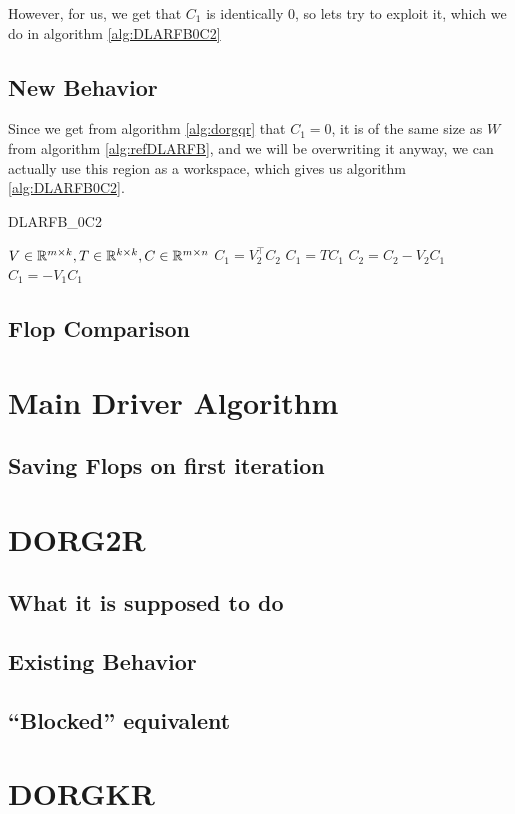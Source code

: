 \documentclass[12pt]{article}
\begin{document}
        However, for us, we get that $C_1$ is identically $0$, so lets try to exploit it, which we do in 
        algorithm \ref{alg:DLARFB0C2}
    \subsection{New Behavior}
    Since we get from algorithm \ref{alg:dorgqr} that $C_1 = 0$, it is of the same size as $W$ from 
    algorithm \ref{alg:refDLARFB}, and we will be overwriting it anyway, we can actually use this 
    region as a workspace, which gives us algorithm \ref{alg:DLARFB0C2}.
    \begin{algorithm}
        \caption{DLARFB\_0C2}\label{alg:DLARFB0C2}
        \begin{algorithmic}[1]
            \REQUIRE $V\in\mathbb{R}^{m\times k}, T\in\mathbb{R}^{k\times k}, C\in\mathbb{R}^{m\times n}$
            \STATE $C_1 = V_2^\top C_2$
            \STATE $C_1 = TC_1$
            \STATE $C_2 = C_2 - V_2C_1$
            \STATE $C_1 =     - V_1C_1$
        \end{algorithmic}
    \end{algorithm}
    \subsection{Flop Comparison}
    \section{Main Driver Algorithm}
    \subsection{Saving Flops on first iteration}
    \section{DORG2R}
    \subsection{What it is supposed to do}
    \subsection{Existing Behavior}
    \subsection{``Blocked'' equivalent}
    \section{DORGKR}
\end{document}
